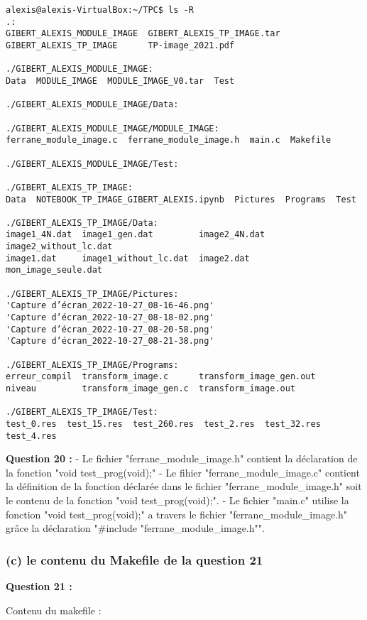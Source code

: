 \documentclass[11pt]{article}
\begin{document}
\begin{verbatim}
alexis@alexis-VirtualBox:~/TPC$ ls -R
.:
GIBERT_ALEXIS_MODULE_IMAGE  GIBERT_ALEXIS_TP_IMAGE.tar
GIBERT_ALEXIS_TP_IMAGE      TP-image_2021.pdf

./GIBERT_ALEXIS_MODULE_IMAGE:
Data  MODULE_IMAGE  MODULE_IMAGE_V0.tar  Test

./GIBERT_ALEXIS_MODULE_IMAGE/Data:

./GIBERT_ALEXIS_MODULE_IMAGE/MODULE_IMAGE:
ferrane_module_image.c  ferrane_module_image.h  main.c  Makefile

./GIBERT_ALEXIS_MODULE_IMAGE/Test:

./GIBERT_ALEXIS_TP_IMAGE:
Data  NOTEBOOK_TP_IMAGE_GIBERT_ALEXIS.ipynb  Pictures  Programs  Test

./GIBERT_ALEXIS_TP_IMAGE/Data:
image1_4N.dat  image1_gen.dat         image2_4N.dat  image2_without_lc.dat
image1.dat     image1_without_lc.dat  image2.dat     mon_image_seule.dat

./GIBERT_ALEXIS_TP_IMAGE/Pictures:
'Capture d’écran_2022-10-27_08-16-46.png'
'Capture d’écran_2022-10-27_08-18-02.png'
'Capture d’écran_2022-10-27_08-20-58.png'
'Capture d’écran_2022-10-27_08-21-38.png'

./GIBERT_ALEXIS_TP_IMAGE/Programs:
erreur_compil  transform_image.c      transform_image_gen.out
niveau         transform_image_gen.c  transform_image.out

./GIBERT_ALEXIS_TP_IMAGE/Test:
test_0.res  test_15.res  test_260.res  test_2.res  test_32.res  test_4.res
\end{verbatim}

\textbf{Question 20 :} - Le fichier "ferrane\_module\_image.h" contient
la déclaration de la fonction "void test\_prog(void);" - Le fihier
"ferrane\_module\_image.c" contient la définition de la fonction
déclarée dans le fichier "ferrane\_module\_image.h" soit le contenu de
la fonction "void test\_prog(void);". - Le fichier "main.c" utilise la
fonction "void test\_prog(void);" a travers le fichier
"ferrane\_module\_image.h" grâce la déclaration "\#include
"ferrane\_module\_image.h"".

\subsubsection{(c) le contenu du Makefile de la question
21}\label{c-le-contenu-du-makefile-de-la-question-21}

\textbf{Question 21 :}

Contenu du makefile :
\end{document}

